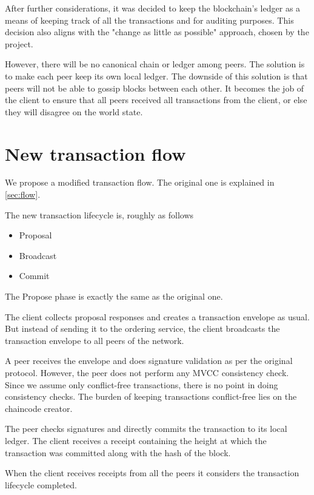 After further considerations, it was decided to keep the blockchain's ledger as a means of keeping track of all the transactions and for auditing purposes. This decision also aligns with the "change as little as possible" approach, chosen by the project.

However, there will be no canonical chain or ledger among peers. The solution is to make each peer keep its own local ledger. The downside of this solution is that peers will not be able to gossip blocks between each other. It becomes the job of the client to ensure that all peers received all transactions from the client, or else they will disagree on the world state.

\section{New transaction flow}
\label{sec:app-flow}

We propose a modified transaction flow. The original one is explained in \ref{sec:flow}.

The new transaction lifecycle is, roughly as follows

\begin{itemize}
  \item Proposal
  \item Broadcast
  \item Commit
\end{itemize}

The Propose phase is exactly the same as the original one.

The client collects proposal responses and creates a transaction envelope as usual.  But instead of sending it to the ordering service, the client broadcasts the transaction envelope to all peers of the network.

A peer receives the envelope and does signature validation as per the original protocol. However, the peer does not perform any MVCC consistency check. Since we assume only conflict-free transactions, there is no point in doing consistency checks. The burden of keeping transactions conflict-free lies on the chaincode creator.

The peer checks signatures and directly commits the transaction to its local ledger. The client receives a receipt containing the height at which the transaction was committed along with the hash of the block.

When the client receives receipts from all the peers it considers the transaction lifecycle completed.

